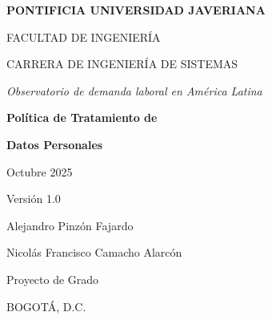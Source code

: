 \documentclass[11pt,oneside,letterpaper]{article}
\begin{document}
\begin{titlepage}
    \centering
    \vspace*{2cm}

    {\LARGE\bfseries PONTIFICIA UNIVERSIDAD JAVERIANA\par}

    \vspace{0.5cm}

    {\large FACULTAD DE INGENIERÍA\par}
    {\large CARRERA DE INGENIERÍA DE SISTEMAS\par}

    \vspace{2.5cm}

    {\Large\itshape Observatorio de demanda laboral en América Latina\par}

    \vspace{2cm}

    {\huge\bfseries Política de Tratamiento de\par}
    {\huge\bfseries Datos Personales\par}

    \vspace{2cm}

    {\Large Octubre 2025\par}

    \vspace{0.5cm}

    {\large Versión 1.0\par}

    \vspace{1.5cm}

    {\large Alejandro Pinzón Fajardo\par}
    \vspace{0.3cm}
    {\large Nicolás Francisco Camacho Alarcón\par}

    \vfill

    {\large Proyecto de Grado\par}

    \vspace{0.5cm}

    {\large BOGOTÁ, D.C.\par}

\end{titlepage}
\end{document}
